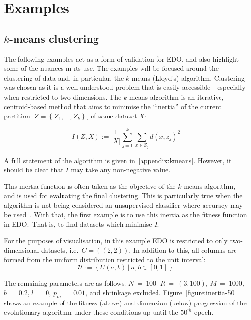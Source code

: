 \section{Examples}\label{section:examples}

\subsection{\(k\)-means clustering}

The following examples act as a form of validation for EDO, and also highlight
some of the nuances in its use. The examples will be focused around the
clustering of data and, in particular, the \(k\)-means (Lloyd's) algorithm.
Clustering was chosen as it is a well-understood problem that is easily
accessible \-- especially when restricted to two dimensions. The \(k\)-means
algorithm is an iterative, centroid-based method that aims to minimise the
``inertia'' of the current partition, \(Z = \left\{Z_1, \ldots, Z_k\right\}\),
of some dataset \(X\):

\begin{equation}
    I(Z, X) := \frac{1}{|X|} \sum_{j=1}^{k} \sum_{x \in Z_j} {d(x, z_j)}^2
\end{equation}

A full statement of the algorithm is given in~\ref{appendix:kmeans}. However, it
should be clear that \(I\) may take any non-negative value.

This inertia function is often taken as the objective of the \(k\)-means
algorithm, and is used for evaluating the final clustering. This is particularly
true when the algorithm is not being considered an unsupervised classifier where
accuracy may be used~\cite{Huang1998}. With that, the first example is to use
this inertia as the fitness function in EDO.\ That is, to find datasets which
minimise \(I\).

For the purposes of visualisation, in this example EDO is restricted to only
two-dimensional datasets, i.e.\ \(C = \left((2, 2)\right)\). In addition to
this, all columns are formed from the uniform distribution restricted to the
unit interval:
\[
    \mathcal{U} := \left\{U(a, b)~|~a, b \in [0, 1]\right\}
\]

The remaining parameters are as follows: \(N~=~100\), \(R~=~(3, 100)\),
\(M~=~1000\), \(b~=~0.2\), \(l~=~0\), \(p_m~=~0.01\), and shrinkage excluded.
Figure~\ref{figure:inertia-50} shows an example of the fitness (above) and
dimension (below) progression of the evolutionary algorithm under these
conditions up until the \(50^{th}\) epoch.

